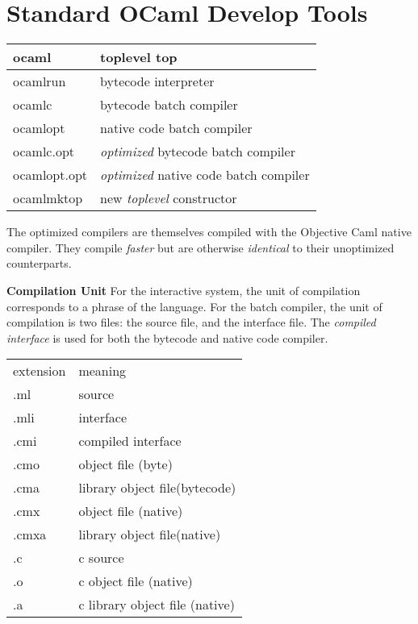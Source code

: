 \section{Standard OCaml Develop Tools}



\begin{table}[ht]
\centering
\begin{tabular}{|l|l|}
  \hline
  ocaml & toplevel top \\
  \hline
  ocamlrun & bytecode interpreter \\
  \hline
  ocamlc & bytecode batch compiler \\
  \hline
  ocamlopt & native code batch compiler \\
  \hline
  ocamlc.opt & \textit{optimized} bytecode batch compiler \\
  \hline
  ocamlopt.opt & \textit{optimized} native code batch compiler \\
  \hline
  ocamlmktop & new \textit{toplevel} constructor \\
  \hline
\end{tabular}
\end{table}
The optimized compilers are themselves compiled with the Objective
Caml native compiler.  They compile \textit{faster} but are otherwise
\textit{identical} to their unoptimized counterparts.

\textbf{Compilation Unit} For the interactive system, the unit of
compilation corresponds to a phrase of the language. For the batch
compiler, the unit of compilation is two files: the source file, and
the interface file. The \textit{compiled interface} is used for both
the bytecode and native code compiler.


\begin{tabular}{|l|l|}
  \hline
  extension & meaning \\
  .ml & source \\
  .mli & interface \\
  .cmi & compiled interface \\
  .cmo & object file (byte) \\
  .cma & library object file(bytecode) \\
  .cmx & object file (native) \\
  .cmxa & library object file(native) \\
  \hline
  .c & c source \\
  .o & c object file (native) \\
  .a & c library object file (native) \\
  \hline
\end{tabular}

